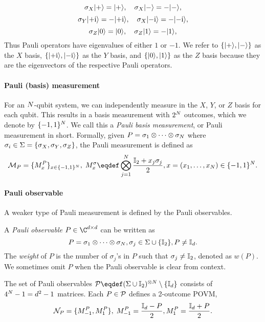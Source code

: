 \[
\sigma_X|{+}\rangle=|{+}\rangle, \quad\sigma_X|{-}\rangle=-|{-}\rangle,
\]
\[
\sigma_Y|{+\text{i}}\rangle=-|{+\text{i}}\rangle, \quad\sigma_X|{-\text{i}}\rangle=-|{-\text{i}}\rangle,
\]
\[
\sigma_Z|{0}\rangle=|{0}\rangle, \quad\sigma_Z|{1}\rangle=-|{1}\rangle,
\]
Thus Pauli operators have eigenvalues of either $1$ or $-1$. We refer to $\{|{+}\rangle,|{-}\rangle\}$ as the $X$ basis, $\{|{+\text{i}}\rangle,|{-\text{i}}\rangle\}$ as the $Y$ basis, and $\{|{0}\rangle,|{1}\rangle\}$ as the $Z$ basis because they are the eigenvectors of the respective Pauli operators.

\paragraph{Pauli (basis) measurement} For an ${N}$-qubit system, we can independently measure in the $X$, $Y$, or $Z$ basis for each qubit. This results in a basis measurement with $2^{N}$ outcomes, which we denote by $\{-1, 1\}^{{N}}$. We call this a \emph{Pauli basis measurement}, or Pauli measurement in short. Formally, given $P=\sigma_1\otimes\cdots\otimes\sigma_{{N}}$ where $\sigma_i\in \Sigma=\{{\sigma_X}, {\sigma_Y}, {\sigma_Z}\}$, the Pauli measurement is defined as
\begin{equation}
    \POVM_{P}=\{M_x^P\}_{x\in \{-1, 1\}^{\nqubits}},\; M_x^\sigma\eqdef \bigotimes_{j=1}^{\nqubits}\frac{\eye_2+x_j\sigma_j}{2},x=(x_1, \ldots, x_{\nqubits})\in\{-1, 1\}^{\nqubits}.
    \label{equ:pauli-measurement}
\end{equation}

\paragraph{Pauli observable} A weaker type of Pauli measurement is defined by the Pauli observables.
\begin{definition}
    A \emph{Pauli observable} $P\in \C^{\dims\times\dims}$ can be written as
\[
P=\sigma_1\otimes\cdots\otimes \sigma_{{N}}, \sigma_j\in\Sigma\cup\{\mathbb{I}_2\}, P\ne \mathbb{I}_d.
\]
The \emph{weight} of $P$ is the number of $\sigma_j$'s in $P$ such that $\sigma_j\ne \mathbb{I}_2$, denoted as $w(P)$. We sometimes omit $P$ when the Pauli observable is clear from context.
\end{definition}

The set of Pauli observables $\pauliObsSet\eqdef (\Sigma\cup \eye_2)^{\otimes\nqubits}\setminus\{\eye_\dims\}$ consists of $4^{{N}}-1=d^2-1$ matrices. Each $P\in{\mathcal{P}}$ defines a 2-outcome POVM,
\[
\mathcal{N}_P=\{M_{-1}^P, M_{1}^P\},\; M_{-1}^P=\frac{\mathbb{I}_d - P}{2}, M_1^P=\frac{\mathbb{I}_d+P}{2}.
\]

